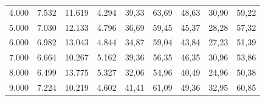 \begin{table}[ht!]
\begin{tabular}{lcccccccc}
4.000               & 7.532          & 11.619         & 4.294          & 39,33                                                             & 63,69                                                          & 48,63                                                           & 30,90                                                               & 59,22                                                             \\
5.000               & 7.030          & 12.133         & 4.796          & 36,69                                                             & 59,45                                                          & 45,37                                                           & 28,28                                                               & 57,32                                                             \\
6.000               & 6.982          & 13.043         & 4.844          & 34,87                                                             & 59,04                                                          & 43,84                                                           & 27,23                                                               & 51,39                                                             \\
7.000               & 6.664          & 10.267         & 5.162          & 39,36                                                             & 56,35                                                          & 46,35                                                           & 30,96                                                               & 53,86                                                             \\
8.000               & 6.499          & 13.775         & 5.327          & 32,06                                                             & 54,96                                                          & 40,49                                                           & 24,96                                                               & 50,38                                                             \\
9.000               & 7.224          & 10.219         & 4.602          & 41,41                                                             & 61,09                                                          & 49,36                                                           & 32,95                                                               & 60,85                                                             \\

\end{tabular}
\end{table}
